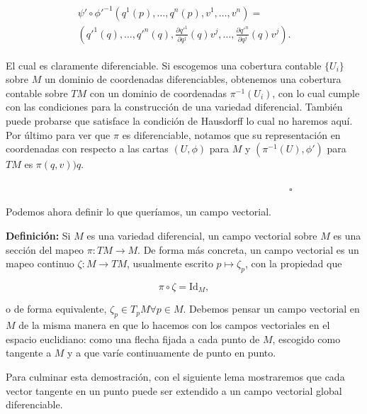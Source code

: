\documentclass[a4paper,10pt]{article}
\numberwithin{equation}{section}
\newcommand{\definicion}{\textbf{Definición: }}
\begin{document}
\begin{align}
\begin{split}
 \psi' \circ \phi'^{-1}(q^1(p),\dots,q^n(p),v^1,\dots,v^n) = \\
 \left(q'^1(q),\dots,q'^n(q),\frac{\partial q'^1}{\partial q^j}(q)v^j, 
 \dots,\frac{\partial q'^n}{\partial q^j}(q)v^j\right).
 \end{split}
\end{align}

El cual es claramente diferenciable. Si escogemos una cobertura contable 
$\{U_i\}$ sobre $M$ un dominio de coordenadas diferenciables, obtenemos 
una cobertura contable sobre $TM$ con un dominio de coordenadas ${\pi^{-1}(U_i)}$,
con lo cual cumple con las condiciones para la construcción de una variedad 
diferencial. También puede probarse que satisface la condición de Hausdorff 
lo cual no haremos aquí. Por último para ver que $\pi$ es diferenciable, 
notamos que su representación en coordenadas con respecto a las cartas 
$(U,\phi)$ para $M$ y $(\pi^{-1}(U),\phi')$ para $TM$ es $\pi(q,v))q$.

$\hspace{12cm} \square$

Podemos ahora definir lo que queríamos, un campo vectorial.

\vspace{.3cm}

\definicion Si $M$ es una variedad diferencial, un campo vectorial 
sobre $M$ es una sección del mapeo $\pi:TM \rightarrow M$. De forma 
más concreta, un campo vectorial es un mapeo continuo $\zeta:M \rightarrow TM$, 
usualmente escrito $p \mapsto \zeta_p$, con la propiedad que 

\begin{equation}
 \pi \circ \zeta = \text{Id}_M,
\end{equation}

o de forma equivalente, $\zeta_p \in T_p M \forall p \in M$. Debemos pensar un 
campo vectorial en $M$ de la misma manera en que lo hacemos con los campos vectoriales 
en el espacio euclidiano: como una flecha fijada a cada punto de $M$, escogido como 
tangente a $M$ y a que varíe continuamente de punto en punto.

\vspace{.3cm}

Para culminar esta demostración, con el siguiente lema mostraremos que cada vector 
tangente en un punto puede ser extendido a un campo vectorial global diferenciable.

\vspace{.3cm}
\end{document}
